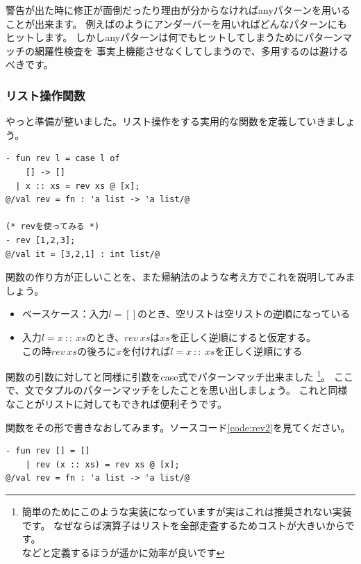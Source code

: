 \documentclass[11pt,a4paper]{jarticle}
\begin{document}
警告が出た時に修正が面倒だったり理由が分からなければanyパターンを用いることが出来ます。
例えばのようにアンダーバーを用いればどんなパターンにもヒットします。
しかしanyパターンは何でもヒットしてしまうためにパターンマッチの網羅性検査を
事実上機能させなくしてしまうので、多用するのは避けるべきです。

\subsubsection{リスト操作関数}

やっと準備が整いました。リスト操作をする実用的な関数を定義していきましょう。

\begin{lstlisting}[caption=リストを逆順にする関数revを定義する,label=code:rev1]
- fun rev l = case l of
    [] -> []
  | x :: xs = rev xs @ [x];
@/val rev = fn : 'a list -> 'a list/@

(* revを使ってみる *)
- rev [1,2,3];
@/val it = [3,2,1] : int list/@
\end{lstlisting}

関数の作り方が正しいことを、また帰納法のような考え方でこれを説明してみましょう。
\begin{itemize}
\item ベースケース：入力$l=[]$のとき、空リストは空リストの逆順になっている
\item 入力$l = x \ :: \ xs$のとき、$rev \ xs$は$xs$を正しく逆順にすると仮定する。\\
  この時$rev \ xs$の後ろに$x$を付ければ$l = x \ :: \ xs$を正しく逆順にする
\end{itemize}

関数の引数に対してと同様に引数をcase式でパターンマッチ出来ました
\footnote{簡単のためにこのような実装になっていますが実はこれは推奨されない実装です。
なぜならば演算子はリストを全部走査するためコストが大きいからです。\\
などと定義するほうが遥かに効率が良いです}。
ここで、文でタプルのパターンマッチをしたことを思い出しましょう。
これと同様なことがリストに対してもできれば便利そうです。

関数をその形で書きなおしてみます。ソースコード\ref{code:rev2}を見てください。

\begin{lstlisting}[caption=引数部分でのパターンマッチ,label=code:rev2]
- fun rev [] = []
    | rev (x :: xs) = rev xs @ [x];
@/val rev = fn : 'a list -> 'a list/@
\end{lstlisting}
\end{document}
